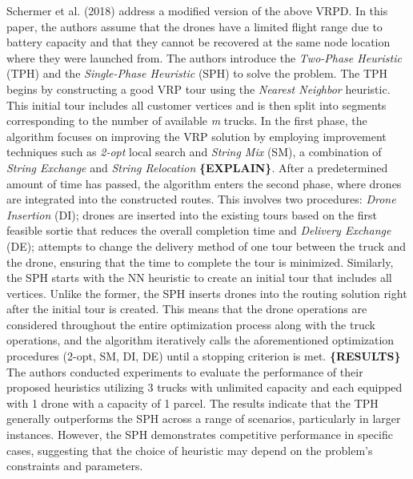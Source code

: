 \documentclass{article}
\begin{document}
	\par 
	Schermer et al. (2018) \cite{Schermer2018} address a modified version of the above VRPD. In this paper, the authors assume that the drones have a limited flight range due to battery capacity and that they cannot be recovered at the same node location where they were launched from. The authors introduce the \textit{Two-Phase Heuristic} (TPH) and the \textit{Single-Phase Heuristic} (SPH) to solve the problem. The TPH begins by constructing a good VRP tour using the \textit{Nearest Neighbor} heuristic. This initial tour includes all customer vertices and is then split into segments corresponding to the number of available \textit{m} trucks. In the first phase, the algorithm focuses on improving the VRP solution by employing improvement techniques such as \textit{2-opt} local search and \textit{String Mix} (SM), a combination of \textit{String Exchange} and \textit{String Relocation} \textbf{\{EXPLAIN\}}. After a predetermined amount of time has passed, the algorithm enters the second phase, where drones are integrated into the constructed routes. This involves two procedures: \textit{Drone Insertion} (DI); drones are inserted into the existing tours based on the first feasible sortie that reduces the overall completion time and \textit{Delivery Exchange} (DE); attempts to change the delivery method of one tour between the truck and the drone, ensuring that the time to complete the tour is minimized. Similarly, the SPH starts with the NN heuristic to create an initial tour that includes all vertices. Unlike the former, the SPH inserts drones into the routing solution right after the initial tour is created. This means that the drone operations are considered throughout the entire optimization process along with the truck operations, and the algorithm iteratively calls the aforementioned optimization procedures (2-opt, SM, DI, DE) until a stopping criterion is met. \textbf{\{RESULTS\}} The authors conducted experiments to evaluate the performance of their proposed heuristics utilizing 3 trucks with unlimited capacity and each equipped with 1 drone with a capacity of 1 parcel. The results indicate that the TPH generally outperforms the SPH across a range of scenarios, particularly in larger instances. However, the SPH demonstrates competitive performance in specific cases, suggesting that the choice of heuristic may depend on the problem's constraints and parameters.
	\par 
\end{document}
